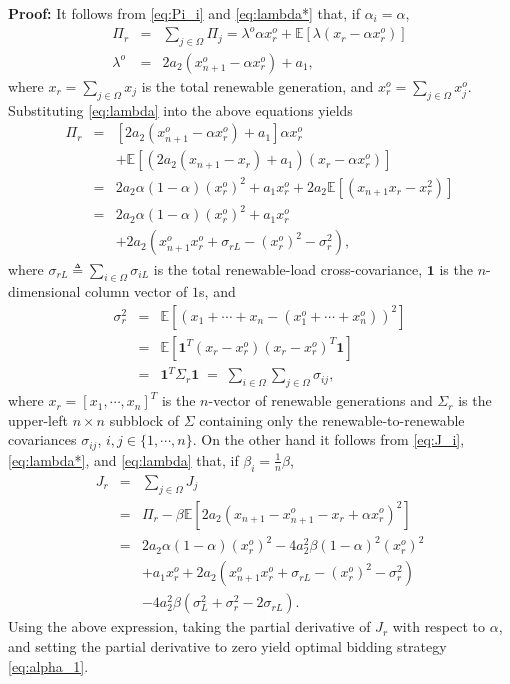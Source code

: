 \documentclass[journal]{IEEEtran}
\newcommand{\one}{\mathbf{1}}
\begin{document}
\noindent \textbf{Proof:} It follows from \eqref{eq:Pi_i} and \eqref{eq:lambda*} that, if $\alpha_i=\alpha$, 
\begin{eqnarray*}
\Pi_r & = & \sum_{j\in\Omega} \Pi_j = \lambda^o \alpha x_r^o +  \mathbb{E}[\lambda (x_r-\alpha x_r^o)] \\
 \lambda^o   & = & 2a_2\left(x_{n+1}^o-\alpha x_r^o \right) +a_1,
\end{eqnarray*}
where $x_r = \sum_{j\in\Omega} x_j$ is the total renewable generation, and $x_r^o = \sum_{j\in\Omega} x_j^o$. Substituting \eqref{eq:lambda} into the above equations yields
\begin{eqnarray}
\Pi_r & = &  [2a_2\left(x_{n+1}^o-\alpha x_r^o \right) +a_1] \alpha x_r^o \nonumber \\
&& + \mathbb{E}[(2a_2\left(x_{n+1}-x_r \right) + a_1)(x_r-\alpha x_r^o)] \nonumber \\
  & = & 2a_2\alpha(1-\alpha)(x_r^o)^2 +a_1x_r^o  + 2a_2\mathbb{E}[\left(x_{n+1}x_r-x_r^2 \right)] \nonumber\\
   & = & 2a_2\alpha(1-\alpha)(x_r^o)^2 +a_1x_r^o \nonumber \\
   && + 2a_2\left(x_{n+1}^ox_r^o+\sigma_{rL}-(x_r^o)^2-\sigma_r^2 \right), \label{eq:Pi_r_exp}
\end{eqnarray}
where $\sigma_{rL}\triangleq\sum_{i\in\Omega}\sigma_{iL}$ is the total renewable-load cross-covariance, $\one$ is the $n$-dimensional column vector of $1$s, and
\begin{eqnarray*}
    \sigma_r^2 & = & \mathbb{E}[(x_1+\cdots+x_n-(x_1^o+\cdots+x_n^o))^2] \\
    & = & \mathbb{E}[ \one^T (x_r-x_r^o)(x_r-x_r^o)^T\one] \\
    & = & \one^T \Sigma_r \one \;=\; \sum_{i\in\Omega}\sum_{j\in\Omega} \sigma_{ij},
\end{eqnarray*}
where $x_r = [x_1,\cdots,x_n]^T$ is the $n$-vector of renewable generations and $\Sigma_r$ is the upper-left $n\times n$ subblock of $\Sigma$ containing only the renewable-to-renewable covariances $\sigma_{ij}$, $i,j\in\{1,\cdots,n\}$.
On the other hand it follows from \eqref{eq:J_i}, \eqref{eq:lambda*}, and \eqref{eq:lambda} that, if $\beta_i = \frac{1}{n}\beta$,
\begin{eqnarray*}
J_r & = & \sum_{j\in\Omega} J_j \\
 & = & \Pi_r  - \beta \mathbb{E}[2a_2 (x_{n+1}-x_{n+1}^o -x_r +\alpha x_r^o)^2] \\
 & = & 2a_2\alpha(1-\alpha)(x_r^o)^2  - 4a_2^2  \beta  (1-\alpha)^2 (x_r^o)^2 \\
 & & +a_1x_r^o + 2a_2\left(x_{n+1}^ox_r^o+\sigma_{rL}-(x_r^o)^2-\sigma_r^2 \right)\\
 && - 4a_2^2  \beta (\sigma_L^2+\sigma_r^2 - 2\sigma_{rL}). 
\end{eqnarray*}
Using the above expression, taking the partial derivative of $J_r$ with respect to $\alpha$, and setting the partial derivative to zero yield optimal bidding strategy \eqref{eq:alpha_1}. 
\end{document}

